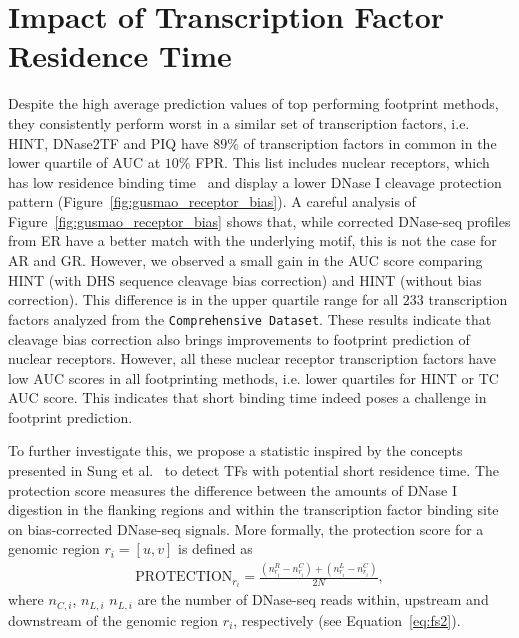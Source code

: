 \section{Impact of Transcription Factor Residence Time}
\label{sec:impact.tf.residence.time}


Despite the high average prediction values of top performing footprint methods, they consistently perform worst in a similar set of transcription factors, i.e. HINT, DNase2TF and PIQ have $89\%$ of transcription factors in common in the lower quartile of AUC at $10\%$ FPR. This list includes nuclear receptors, which has low residence binding time~\cite{sung2014} and display a lower DNase I cleavage protection pattern (Figure~\ref{fig:gusmao_receptor_bias}). A careful analysis of Figure~\ref{fig:gusmao_receptor_bias} shows that, while corrected DNase-seq profiles from ER have a better match with the underlying motif, this is not the case for AR and GR. However, we observed a small gain in the AUC score comparing HINT (with DHS sequence cleavage bias correction) and HINT (without bias correction). This difference is in the upper quartile range for all $233$ transcription factors analyzed from the {\tt Comprehensive Dataset}. These results indicate that cleavage bias correction also brings improvements to footprint prediction of nuclear receptors. However, all these nuclear receptor transcription factors have low AUC scores in all footprinting methods, i.e. lower quartiles for HINT or TC AUC score. This indicates that short binding time indeed poses a challenge in footprint prediction.

To further investigate this, we propose a statistic inspired by the concepts presented in Sung et al.~\cite{sung2014} to detect TFs with potential short residence time. The protection score measures the difference between the amounts of DNase I digestion in the flanking regions and within the transcription factor binding site on bias-corrected DNase-seq signals. More formally, the protection score for a genomic region $r_i = [u, v]$ is defined as
\begin{align}
  \label{eq:prot}
  \text{PROTECTION}_{r_i} = \frac{({n}^{R}_{r_i} - {n}^{C}_{r_i}) + ({n}^{L}_{r_i} - {n}^{C}_{r_i})}{2N},
\end{align}
where ${n}_{C,i}$, ${n}_{L,i}$  ${n}_{L,i}$ are the number of DNase-seq reads within, upstream and downstream of the genomic region $r_i$, respectively (see Equation~\ref{eq:fs2}).


